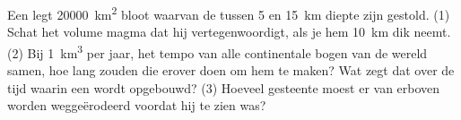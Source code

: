 \begin{exercise}[$\star\star\star$]\label{exo:g12:subduction-magmatism:15}
Een  legt \qty{20000}{km^2}  bloot waarvan de 
tussen 5 en \qty{15}{km} diepte zijn gestold. (1) Schat het volume magma
dat hij vertegenwoordigt, als je hem \qty{10}{km} dik neemt. (2) Bij \qty{1}{km^3} per jaar,
het tempo van alle continentale bogen van de wereld samen, hoe lang zouden die erover
doen om hem te maken? Wat zegt dat over de tijd waarin een
 wordt opgebouwd?
(3) Hoeveel gesteente moest er van erboven worden weggeërodeerd voordat hij te zien was?
\end{exercise}

